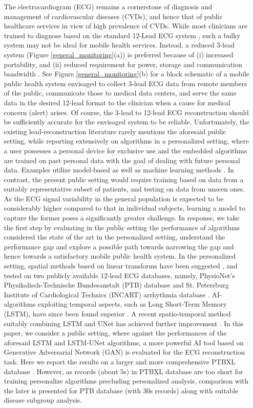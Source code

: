 \documentclass[conference]{IEEEtran}
\begin{document}
The electrocardiogram (ECG) remains a cornerstone of diagnosis and management of cardiovascular diseases (CVDs), and hence that of public healthcare services in view of high prevalence of CVDs. While most clinicians are trained to diagnose based on the standard 12-Lead ECG system \cite{12lead}, such a bulky system may not be ideal for mobile health services. Instead, a reduced 3-lead system (Figure \ref{general_monitoring}(a)) is preferred because of (i) increased portability, and (ii) reduced requirement for power, storage and communication bandwidth \cite{R3lead}. See Figure \ref{general_monitoring}(b) for a block schematic of a mobile public health system envisaged to collect 3-lead ECG data from remote members of the public, communicate those to medical data centers, and serve the same data in the desired 12-lead format to the clinician when a cause for medical concern (alert) arises. Of course, the 3-lead to 12-lead ECG reconstruction should be sufficiently accurate for the envisaged system to be reliable. 
Unfortunately, the existing lead-reconstruction literature rarely mentions the aforesaid public setting, while reporting extensively on algorithms in a personalized setting, where a user possesses a personal device for exclusive use and the embedded algorithms are trained on past personal data with the goal of dealing with future personal data. Examples utilize model-based as well as machine learning methods \cite{dower,affine,amit,lstm,lstm-unet}. In contrast, the present public setting would require training based on data from a suitably representative subset of patients, and testing on data from unseen ones. As the ECG signal variability in the general population is expected to be considerably higher compared to that in individual subjects, learning a model to capture the former poses a significantly greater challenge.
In response, we take the first step by evaluating in the public setting the performance of algorithms considered the state of the art in the personalized setting, understand the performance gap and explore a possible path towards narrowing the gap and hence towards a satisfactory mobile public health system. In the personalized setting, spatial methods based on linear transforms have been suggested \cite{amit}, and tested on two publicly available 12-lead ECG databases, namely, PhysioNet’s Physikalisch-Technische Bundesanstalt (PTB) database and St. Petersburg Institute of Cardiological Technics (INCART)  arrhythmia  database \cite{physionet}. AI-algorithms exploiting temporal aspects, such as Long Short-Term Memory (LSTM), have since been found superior \cite{lstm}. A recent spatio-temporal method suitably combining LSTM and UNet has achieved further improvement \cite{lstm-unet}. 
In this paper, we consider a public setting, where against the performances of the aforesaid LSTM and LSTM-UNet algorithms, a more powerful AI tool based on Generative Adversarial Network (GAN) is evaluated for the ECG reconstruction task. Here we report the results on a larger and more comprehensive PTBXL database \cite{physionet}. However, as records (about 5s) in PTBXL database are too short for training personalize algorithms precluding personalized analysis, comparison with the later is presented for PTB database (with 30s records) along with suitable disease subgroup analysis.
\end{document}
